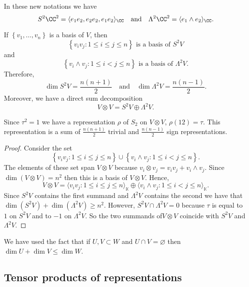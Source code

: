 \documentclass[12pt, a4paper]{article}
\newcommand{\KK}{\mathbb{K}}
\begin{document}
\begin{example}
    In these new notations we have 
    \[S^2\CC^2 = \langle e_1e_2,e_2e_2,e_1e_2 \rangle_{\CC} \quad \text{and} \quad \Lambda^2\CC^2 = \langle e_1\wedge e_2 \rangle_{\CC}.\]
\end{example}

\begin{mdlemma}
    If \(\left\{ v_1,\ldots,v_n \right\}\) is a basis of \(V\), then 
    \[\left\{ v_iv_j : 1\leq i\leq j \leq n \right\} \text{ is a basis of \(S^2V\)}\]
    and 
    \[\left\{ v_i \wedge v_j : 1\leq i<j\leq n \right\} \text{ is a basis of \(\Lambda^2V\)}.\]
    Therefore, 
    \[\dim S^2V = \frac{n(n+1)}{2} \quad \text{and} \quad \dim\Lambda^2V= \frac{n(n-1)}{2}.\]
    Moreover, we have a direct sum decomposition 
    \[V\otimes V = S^2V \oplus \Lambda^2 V.\]
\end{mdlemma}

\begin{mdremark}
    Since \(\tau^2=1\) we have a representation \(\rho\) of \(S_2\) on \(V \otimes V\), \(\rho(12)=\tau\). This representation is a sum of \(\frac{n(n+1)}{2}\) trivial and \(\frac{n(n-1)}{2}\) sign representations.
\end{mdremark}

\begin{proof}
    Consider the set 
    \[\left\{ v_iv_j : 1\leq i\leq j \leq n \right\}\cup\left\{ v_i \wedge v_j : 1\leq i<j\leq n \right\}.\]
    The elements of these set span \(V \otimes V\) because \(v_i \otimes v_j = v_iv_j +v_i \wedge v_j\). Since \(\dim(V \otimes V)=n^2\) then this is a basis of \(V \otimes V\). Hence, 
    \[V\otimes V = \langle v_iv_j : 1\leq i\leq j \leq n \rangle_{\KK} \oplus \langle v_i \wedge v_j : 1\leq i<j\leq n \rangle_{\KK}.\]
    Since \(S^2V\) contains the first summand and \(\Lambda^2V\) contains the second we have that \(\dim(S^2V)+\dim(\Lambda^2 V)\geq n^2\). However, \(S^2V\cap \Lambda^2V=0\) because \(\tau\) is equal to \(1\) on \(S^2V\) and to \(-1\) on \(\Lambda^2V\). So the two summands of\(V\otimes V\) coincide with \(S^2V\) and \(\Lambda^2V\).
\end{proof}

\begin{mdremark}
    We have used the fact that if \(U,V \subset W\) and \(U \cap V=\varnothing\) then \(\dim U+\dim V \leq \dim W\).
\end{mdremark}

\subsection{Tensor products of representations}
\end{document}
